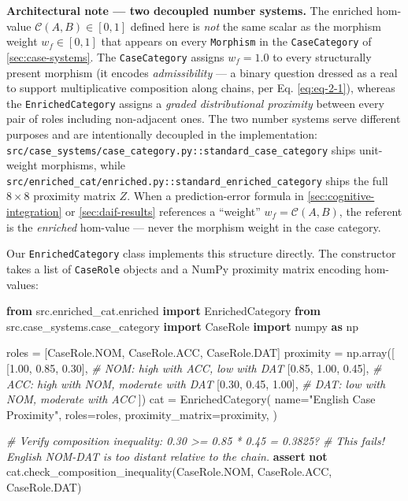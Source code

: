 \documentclass[
]{article}
\newenvironment{Shaded}{}{}
\newcommand{\CommentTok}[1]{\textcolor[rgb]{0.38,0.63,0.69}{\textit{#1}}}
\newcommand{\ControlFlowTok}[1]{\textcolor[rgb]{0.00,0.44,0.13}{\textbf{#1}}}
\newcommand{\FloatTok}[1]{\textcolor[rgb]{0.25,0.63,0.44}{#1}}
\newcommand{\ImportTok}[1]{\textcolor[rgb]{0.00,0.50,0.00}{\textbf{#1}}}
\newcommand{\KeywordTok}[1]{\textcolor[rgb]{0.00,0.44,0.13}{\textbf{#1}}}
\newcommand{\NormalTok}[1]{#1}
\newcommand{\OperatorTok}[1]{\textcolor[rgb]{0.40,0.40,0.40}{#1}}
\newcommand{\StringTok}[1]{\textcolor[rgb]{0.25,0.44,0.63}{#1}}
\begin{document}
\textbf{Architectural note --- two decoupled number systems.} The
enriched hom-value \(\mathcal{C}(A,B) \in [0,1]\) defined here is
\emph{not} the same scalar as the morphism weight \(w_f \in [0,1]\) that
appears on every \texttt{Morphism} in the \texttt{CaseCategory} of
\autoref{sec:case-systems}. The \texttt{CaseCategory} assigns
\(w_f = 1.0\) to every structurally present morphism (it encodes
\emph{admissibility} --- a binary question dressed as a real to support
multiplicative composition along chains, per Eq. \ref{eq:eq-2-1}),
whereas the \texttt{EnrichedCategory} assigns a \emph{graded
distributional proximity} between every pair of roles including
non-adjacent ones. The two number systems serve different purposes and
are intentionally decoupled in the implementation:
\texttt{src/case\_systems/case\_category.py::standard\_case\_category}
ships unit-weight morphisms, while
\texttt{src/enriched\_cat/enriched.py::standard\_enriched\_category}
ships the full \(8 \times 8\) proximity matrix \(Z\). When a
prediction-error formula in \autoref{sec:cognitive-integration} or
\autoref{sec:daif-results} references a ``weight''
\(w_f = \mathcal{C}(A,B)\), the referent is the \emph{enriched}
hom-value --- never the morphism weight in the case category.

Our \texttt{EnrichedCategory} class implements this structure directly.
The constructor takes a list of \texttt{CaseRole} objects and a NumPy
proximity matrix encoding hom-values:

\begin{Shaded}
\begin{Highlighting}[]
\ImportTok{from}\NormalTok{ src.enriched\_cat.enriched }\ImportTok{import}\NormalTok{ EnrichedCategory}
\ImportTok{from}\NormalTok{ src.case\_systems.case\_category }\ImportTok{import}\NormalTok{ CaseRole}
\ImportTok{import}\NormalTok{ numpy }\ImportTok{as}\NormalTok{ np}

\NormalTok{roles }\OperatorTok{=}\NormalTok{ [CaseRole.NOM, CaseRole.ACC, CaseRole.DAT]}
\NormalTok{proximity }\OperatorTok{=}\NormalTok{ np.array([}
\NormalTok{    [}\FloatTok{1.00}\NormalTok{, }\FloatTok{0.85}\NormalTok{, }\FloatTok{0.30}\NormalTok{],  }\CommentTok{\# NOM: high with ACC, low with DAT}
\NormalTok{    [}\FloatTok{0.85}\NormalTok{, }\FloatTok{1.00}\NormalTok{, }\FloatTok{0.45}\NormalTok{],  }\CommentTok{\# ACC: high with NOM, moderate with DAT}
\NormalTok{    [}\FloatTok{0.30}\NormalTok{, }\FloatTok{0.45}\NormalTok{, }\FloatTok{1.00}\NormalTok{],  }\CommentTok{\# DAT: low with NOM, moderate with ACC}
\NormalTok{])}
\NormalTok{cat }\OperatorTok{=}\NormalTok{ EnrichedCategory(}
\NormalTok{    name}\OperatorTok{=}\StringTok{"English Case Proximity"}\NormalTok{,}
\NormalTok{    roles}\OperatorTok{=}\NormalTok{roles,}
\NormalTok{    proximity\_matrix}\OperatorTok{=}\NormalTok{proximity,}
\NormalTok{)}

\CommentTok{\# Verify composition inequality: 0.30 \textgreater{}= 0.85 * 0.45 = 0.3825?}
\CommentTok{\# This fails! English NOM{-}DAT is too distant relative to the chain.}
\ControlFlowTok{assert} \KeywordTok{not}\NormalTok{ cat.check\_composition\_inequality(CaseRole.NOM, CaseRole.ACC, CaseRole.DAT)}
\end{Highlighting}
\end{Shaded}
\end{document}
